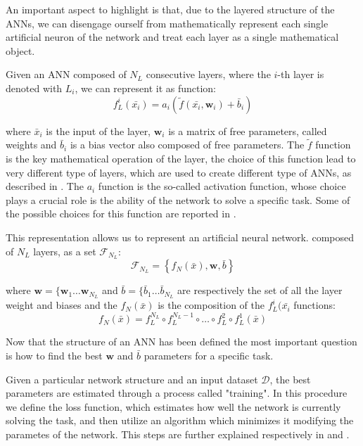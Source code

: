 An important aspect to highlight is that, due to the layered structure of the ANNs, we can disengage ourself from mathematically represent each single artificial neuron of the network and treat each  layer as a single mathematical object. 

Given an ANN composed of $N_L$ consecutive layers, where the $i$-th layer is denoted with $L_i$, we can represent it as function:
\begin{equation}
    f_L^i (\bar{x_i})=a_i \left( \tilde{f}(\bar{x_i}, \boldsymbol{w}_i) + \bar{b}_i \right) 
    \label{eq:layer_math}
\end{equation}

where $\bar{x}_i$ is the input of the layer, $\boldsymbol{w}_i$ is a matrix of free parameters, called weights and $\bar{b}_i$ is a bias vector also composed of free parameters. The $\tilde{f}$ function is the key mathematical operation of the layer, the choice of this function lead to very different type of layers, which are used to create different type of ANNs, as described in . The $a_i$ function is the so-called activation function, whose choice plays a crucial role is the ability of the network to solve a specific task. Some of the possible choices for this function are reported in .

This representation allows us to represent an artificial neural network. composed of $N_L$ layers, as a set $\mathcal{F}_{N_L}$:
\begin{equation}
\mathcal{F}_{N_L} = \left\{ f_N(\bar{x}), \boldsymbol{w}, \bar{b}\right\}
\end{equation}

where $\boldsymbol{w} = \{\boldsymbol{w}_1 \dots \boldsymbol{w}_{N_L}$ and 
$ \bar{b} = \{ \bar{b}_1 \dots  \bar{b}_{N_L}$ are respectively the set of all the layer weight and biases and the $f_N(\bar{x})$ is the composition of the $f_L^i(\bar{x_i}$
functions:
\begin{equation}
    f_N(\bar{x}) = f_L^{N_L} \circ f_L^{N_L-1}\circ\dots\circ f_L^2\circ f_L^1 (\bar{x}) 
\end{equation}

Now that the structure of an ANN has been defined the most important question is how to find the best $\boldsymbol{w}$ and $\bar{b}$ parameters for a specific task.

Given a particular network structure and an input dataset $\mathcal{D}$, the best parameters  are estimated through a process called "training". In this procedure we define the loss function, which estimates how well the network is currently solving the task, and then utilize an algorithm which minimizes it modifying the parametes of the network. This steps are further explained respectively in 
and .

